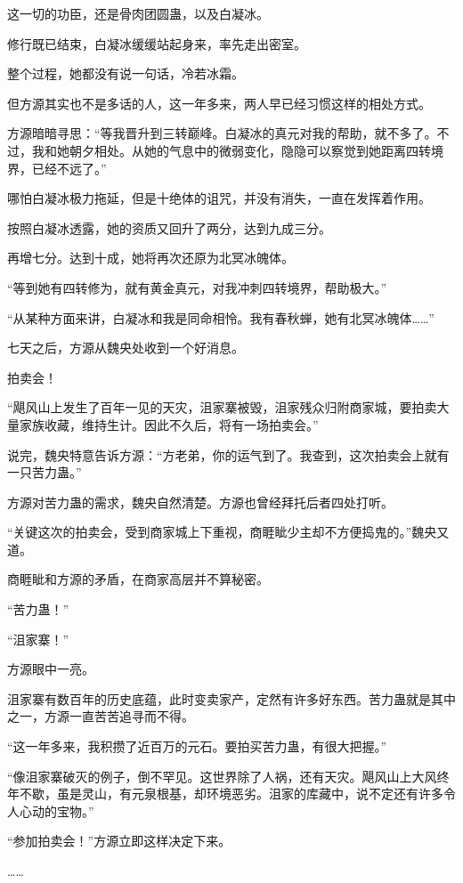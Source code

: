 \begin{this_body}
这一切的功臣，还是骨肉团圆蛊，以及白凝冰。

修行既已结束，白凝冰缓缓站起身来，率先走出密室。

整个过程，她都没有说一句话，冷若冰霜。

但方源其实也不是多话的人，这一年多来，两人早已经习惯这样的相处方式。

方源暗暗寻思：“等我晋升到三转巅峰。白凝冰的真元对我的帮助，就不多了。不过，我和她朝夕相处。从她的气息中的微弱变化，隐隐可以察觉到她距离四转境界，已经不远了。”

哪怕白凝冰极力拖延，但是十绝体的诅咒，并没有消失，一直在发挥着作用。

按照白凝冰透露，她的资质又回升了两分，达到九成三分。

再增七分。达到十成，她将再次还原为北冥冰魄体。

“等到她有四转修为，就有黄金真元，对我冲刺四转境界，帮助极大。”

“从某种方面来讲，白凝冰和我是同命相怜。我有春秋蝉，她有北冥冰魄体……”

七天之后，方源从魏央处收到一个好消息。

拍卖会！

“飓风山上发生了百年一见的天灾，沮家寨被毁，沮家残众归附商家城，要拍卖大量家族收藏，维持生计。因此不久后，将有一场拍卖会。”

说完，魏央特意告诉方源：“方老弟，你的运气到了。我查到，这次拍卖会上就有一只苦力蛊。”

方源对苦力蛊的需求，魏央自然清楚。方源也曾经拜托后者四处打听。

“关键这次的拍卖会，受到商家城上下重视，商睚眦少主却不方便捣鬼的。”魏央又道。

商睚眦和方源的矛盾，在商家高层并不算秘密。

“苦力蛊！”

“沮家寨！”

方源眼中一亮。

沮家寨有数百年的历史底蕴，此时变卖家产，定然有许多好东西。苦力蛊就是其中之一，方源一直苦苦追寻而不得。

“这一年多来，我积攒了近百万的元石。要拍买苦力蛊，有很大把握。”

“像沮家寨破灭的例子，倒不罕见。这世界除了人祸，还有天灾。飓风山上大风终年不歇，虽是灵山，有元泉根基，却环境恶劣。沮家的库藏中，说不定还有许多令人心动的宝物。”

“参加拍卖会！”方源立即这样决定下来。

……


\end{this_body}
